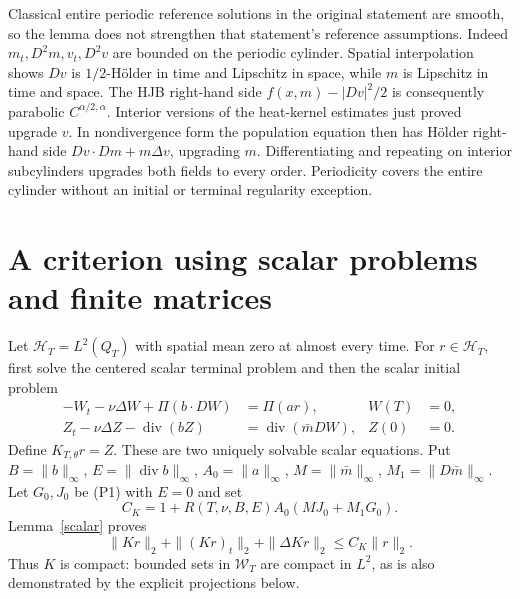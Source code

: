 \documentclass[11pt,a4paper]{article}
\begin{document}
Classical entire periodic reference solutions in the original statement
are smooth, so the lemma does not strengthen that statement's reference
assumptions. Indeed $m_t,D^2m,v_t,D^2v$ are bounded on the periodic
cylinder. Spatial interpolation shows $Dv$ is $1/2$-H\"older in time
and Lipschitz in space, while $m$ is Lipschitz in time and space.
The HJB right-hand side $f(x,m)-|Dv|^2/2$ is consequently parabolic
$C^{\alpha/2,\alpha}$. Interior versions of the heat-kernel estimates
just proved upgrade $v$. In nondivergence form the population equation
then has H\"older right-hand side $Dv\cdot Dm+m\Delta v$, upgrading
$m$. Differentiating and repeating on interior subcylinders upgrades
both fields to every order. Periodicity covers the entire cylinder
without an initial or terminal regularity exception.

\section{A criterion using scalar problems and finite matrices}
Let $\mathcal H_T=L^2(Q_T)$ with spatial mean zero at almost every time.
For $r\in\mathcal H_T$, first solve the centered scalar terminal problem
and then the scalar initial problem
\begin{equation}\tag{K1}\label{K1}
 \begin{aligned}
 -W_t-\nu\Delta W+\Pi(b\cdot DW)&=\Pi(ar),& W(T)&=0,\\
 Z_t-\nu\Delta Z-\operatorname{div}(bZ)
                         &=\operatorname{div}(\bar m DW),& Z(0)&=0.
 \end{aligned}
\end{equation}
Define $K_{T,\theta}r=Z$. These are two uniquely solvable scalar
equations.
Put $B=\|b\|_\infty$, $E=\|\operatorname{div}b\|_\infty$,
$A_0=\|a\|_\infty$, $M=\|\bar m\|_\infty$,
$M_1=\|D\bar m\|_\infty$. Let $G_0,J_0$ be (P1) with $E=0$ and set
\begin{equation}\tag{K2}\label{K2}
 C_K=1+R(T,\nu,B,E)A_0(MJ_0+M_1G_0).
\end{equation}
Lemma~\ref{scalar} proves
\[
 \|Kr\|_2+\|(Kr)_t\|_2+\|\Delta Kr\|_2\leq C_K\|r\|_2.
\]
Thus $K$ is compact: bounded sets in $\mathcal W_T$ are compact in
$L^2$, as is also demonstrated by the explicit projections below.
\end{document}
